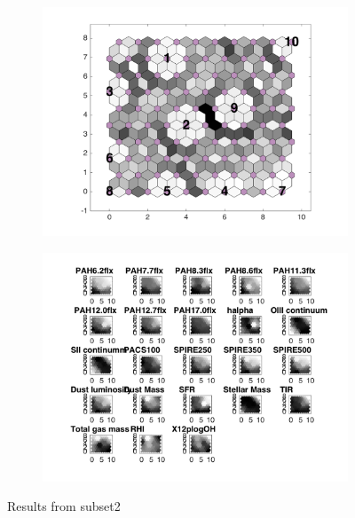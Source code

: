 \begin{figure}
    \begin{subfigure}[b]{0.5\textwidth}
        \centering
        \includegraphics[width=\textwidth]{../../images0.01/M31/2D/image_subsets/subset2_dist_with_hits_t.png}
        \label{fig: subset2_dist}
    \end{subfigure}
    \hfill
    \begin{subfigure}[b]{0.5\textwidth}
        \includegraphics[width=\textwidth]{../../images0.01/M31/2D/image_subsets/weight_planes_subset2.png}
        \label{fig: subset2_plane}
    \end{subfigure}
    \caption{Results from subset2}
    \label{fig: subset2}
\end{figure}